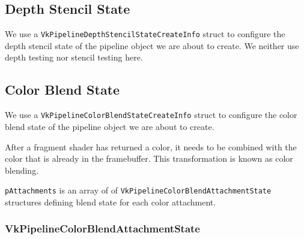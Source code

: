 \begin{minipage}{\linewidth}{\noindent}
    
\end{minipage}

\subsection{Depth Stencil State}

We use a \texttt{VkPipelineDepthStencilStateCreateInfo} struct to configure
the depth stencil state of the pipeline object we are about to create.
We neither use depth testing nor stencil testing here.

\begin{minipage}{\linewidth}{\noindent}
    
\end{minipage}

\subsection{Color Blend State}

We use a \texttt{VkPipelineColorBlendStateCreateInfo} struct to configure
the color blend state of the pipeline object we are about to create.

After a fragment shader has returned a color,
it needs to be combined with the color that is already in the framebuffer.
This transformation is known as color blending.

\begin{minipage}{\linewidth}{\noindent}
    
\end{minipage}

\texttt{pAttachments} is an array of of
\texttt{VkPipelineColorBlendAttachmentState} structures defining blend state for
each color attachment.

\subsubsection{VkPipelineColorBlendAttachmentState}

